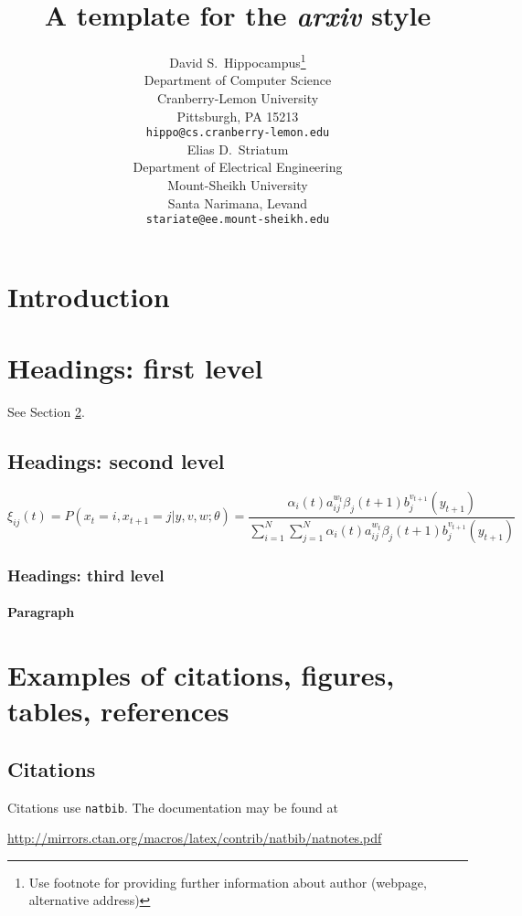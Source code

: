 \documentclass{article}
\title{A template for the \emph{arxiv} style}
\author{David S.~Hippocampus\thanks{Use footnote for providing further
		information about author (webpage, alternative
		address)} \\
	Department of Computer Science\\
	Cranberry-Lemon University\\
	Pittsburgh, PA 15213 \\
	\texttt{hippo@cs.cranberry-lemon.edu} \\
	\And
	Elias D.~Striatum \\
	Department of Electrical Engineering\\
	Mount-Sheikh University\\
	Santa Narimana, Levand \\
	\texttt{stariate@ee.mount-sheikh.edu} \\
}
\begin{document}
\maketitle

\begin{abstract}
	\lipsum[1]
\end{abstract}




\section{Introduction}
\lipsum[2]
\lipsum[3]


\section{Headings: first level}
\label{sec:headings}

\lipsum[4] See Section \ref{sec:headings}.

\subsection{Headings: second level}
\lipsum[5]
\begin{equation}
	\xi _{ij}(t)=P(x_{t}=i,x_{t+1}=j|y,v,w;\theta)= {\frac {\alpha _{i}(t)a^{w_t}_{ij}\beta _{j}(t+1)b^{v_{t+1}}_{j}(y_{t+1})}{\sum _{i=1}^{N} \sum _{j=1}^{N} \alpha _{i}(t)a^{w_t}_{ij}\beta _{j}(t+1)b^{v_{t+1}}_{j}(y_{t+1})}}
\end{equation}

\subsubsection{Headings: third level}
\lipsum[6]

\paragraph{Paragraph}
\lipsum[7]



\section{Examples of citations, figures, tables, references}
\label{sec:others}

\subsection{Citations}
\cite{nesterov2003introductory}
Citations use \verb+natbib+. The documentation may be found at
\begin{center}
	\url{http://mirrors.ctan.org/macros/latex/contrib/natbib/natnotes.pdf}
\end{center}
\end{document}

